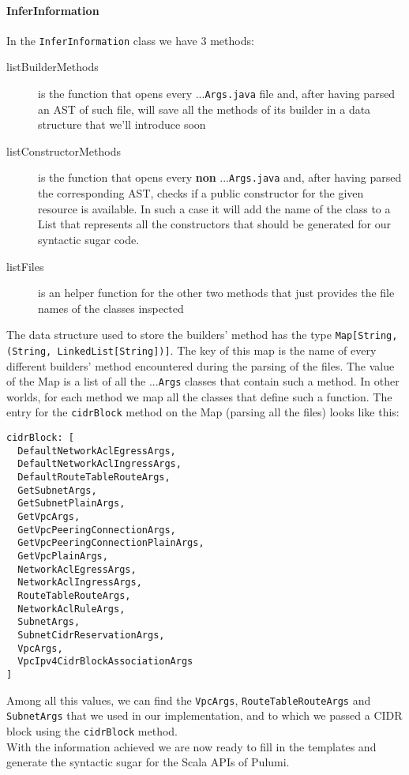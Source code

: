\paragraph{InferInformation}
In the \texttt{InferInformation} class we have 3 methods:
\begin{description}
  \item[listBuilderMethods] is the function that opens every ...\texttt{Args.java} file and, after having parsed an AST of such file, will save all the methods of its builder in a data structure that we'll introduce soon
  \item[listConstructorMethods] is the function that opens every \textbf{non} ...\texttt{Args.java} and, after having parsed the corresponding AST, checks if a public constructor for the given resource is available. In such a case it will add the name of the class to a List that represents all the constructors that should be generated for our syntactic sugar code.
  \item[listFiles] is an helper function for the other two methods that just provides the file names of the classes inspected
\end{description}
The data structure used to store the builders' method has the type \texttt{Map[String, (String, LinkedList[String])]}.
The key of this map is the name of every different builders' method encountered during the parsing of the files.
The value of the Map is a list of all the ...\texttt{Args} classes that contain such a method.
In other worlds, for each method we map all the classes that define such a function.
The entry for the \texttt{cidrBlock} method on the Map (parsing all the files) looks like this:
\begin{verbatim}
cidrBlock: [
  DefaultNetworkAclEgressArgs,
  DefaultNetworkAclIngressArgs,
  DefaultRouteTableRouteArgs,
  GetSubnetArgs,
  GetSubnetPlainArgs,
  GetVpcArgs,
  GetVpcPeeringConnectionArgs,
  GetVpcPeeringConnectionPlainArgs,
  GetVpcPlainArgs,
  NetworkAclEgressArgs,
  NetworkAclIngressArgs,
  RouteTableRouteArgs,
  NetworkAclRuleArgs,
  SubnetArgs,
  SubnetCidrReservationArgs,
  VpcArgs,
  VpcIpv4CidrBlockAssociationArgs
]
\end{verbatim}
Among all this values, we can find the \texttt{VpcArgs}, \texttt{RouteTableRouteArgs} and \texttt{SubnetArgs} that we used in our implementation, and to which we passed a CIDR block using the \texttt{cidrBlock} method.\\
With the information achieved we are now ready to fill in the templates and generate the syntactic sugar for the Scala APIs of Pulumi.

